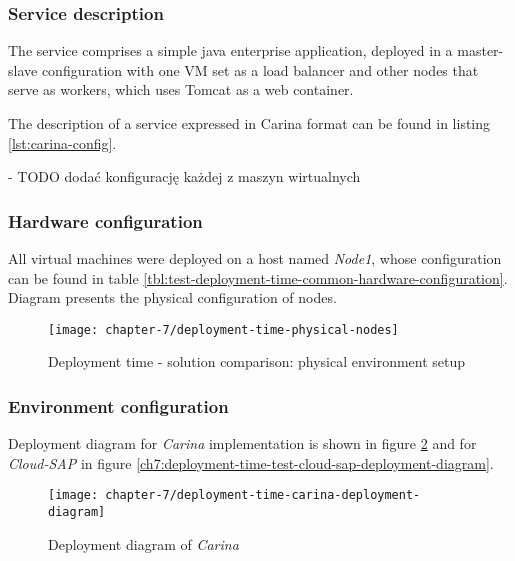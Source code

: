 \subsubsection{Service description}
The service comprises a simple java enterprise application, deployed in a master-slave configuration with one VM set as a load balancer and other nodes that serve as workers, which uses Tomcat as a web container.

The description of a service expressed in Carina format can be found in listing \ref{lst:carina-config}.

- TODO dodać konfigurację każdej z maszyn wirtualnych 

\subsubsection{Hardware configuration}

All virtual machines were deployed on a host named \emph{Node1}, whose configuration can be found in table \ref{tbl:test-deployment-time-common-hardware-configuration}. Diagram presents the physical configuration of nodes.

\begin{figure}[!ht]
  \begin{center}
    \texttt{[image: chapter-7/deployment-time-physical-nodes]}
  \end{center}
  \caption{Deployment time - solution comparison: physical environment setup}
  \label{eval:deployment-time-physical-nodes}
\end{figure}

\subsubsection{Environment configuration}
Deployment diagram for \emph{Carina} implementation is shown in figure \ref{ch7:deployment-time-test-deployment-time-carina-deployment-diagram} and for \emph{Cloud-SAP} in figure \ref{ch7:deployment-time-test-cloud-sap-deployment-diagram}.

\begin{figure}[!ht]
  \begin{center}
    \texttt{[image: chapter-7/deployment-time-carina-deployment-diagram]}
  \end{center}
  \caption{Deployment diagram of \emph{Carina}}
  \label{ch7:deployment-time-test-deployment-time-carina-deployment-diagram}
\end{figure}


